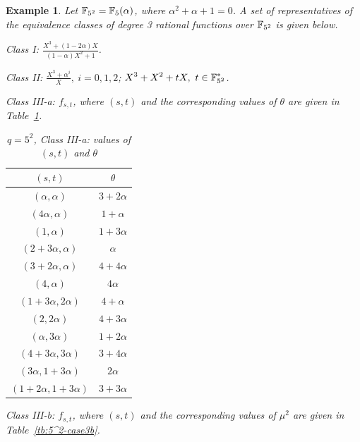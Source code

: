 \documentclass{amsart}
\newtheorem{exmp}[thm]{Example}
\numberwithin{equation}{section}
\theoremstyle{definition}
\newcommand{\f}{\Bbb F}
\newcommand{\A}{\alpha}
\begin{document}
\begin{exmp}\rm
Let $\f_{5^2}=\f_5(\alpha)$, where $\alpha^2+\alpha+1=0$. A set of representatives of the equivalence classes of degree 3 rational functions over $\f_{5^2}$ is given below.

\medskip
Class I: $\displaystyle\frac{X^3+(1-2\alpha)X}{(1-\alpha)X^2+1}$.

\medskip
Class II: $\displaystyle\frac{X^3+\alpha^i}X,\ i=0,1,2$; $\displaystyle{X^3+X^2+t}X,\ t\in\f_{5^2}^*$.

\medskip
Class III-a: $f_{s,t}$, where $(s,t)$ and the corresponding values of $\theta$ are given in Table~\ref{tb:5^2-case3a}.

\begin{table}[ht]
\caption{$q=5^2$, Class III-a: values of $(s,t)$ and $\theta$}\label{tb:5^2-case3a}
   \renewcommand*{\arraystretch}{1.4}
    \centering
     \begin{tabular}{c|c}
         \hline
         $(s,t)$ & $\theta$ \\ \hline
         $(\A, \A)$ & $3+2\A$ \\
         $(4\A,\A)$ & $1+\A$ \\
         $(1,\A)$& $1+3 \A$ \\
         $(2+3\A,\A)$& $\A$ \\
         $(3+2\A,\A)$& $4+4\A$ \\
         $(4,\A)$& $4\A$ \\
         $(1+3\A,2\A)$& $4+\A$ \\
         $(2,2\A)$& $4+3 \A$ \\
         $(\A,3\A)$& $1+2\A$ \\
         $(4+3\A,3\A)$& $3+4\A$ \\
         $(3\A,1+3\A)$& $2\A$ \\
         $(1+2\A,1+3\A)$& $3+3 \A$ \\ \hline
     \end{tabular}
\end{table}


\medskip
Class III-b: $f_{s,t}$, where $(s,t)$ and the corresponding values of $\mu^2$ are given in Table~\ref{tb:5^2-case3b}.


\end{exmp}
\end{document}
